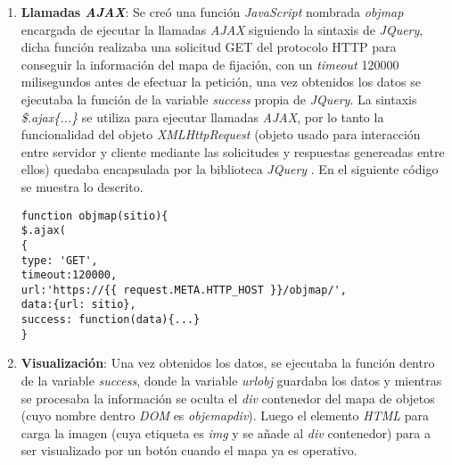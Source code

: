 \begin{enumerate}[label=\alph*) ,font=\bfseries] 
\item \textbf{Llamadas \textit{AJAX}}: Se creó una función \textit{JavaScript} nombrada 
\textit{objmap} encargada de ejecutar la llamadas \textit{AJAX} siguiendo la sintaxis de 
\textit{JQuery}, dicha función realizaba una solicitud GET del protocolo HTTP para conseguir
la información del mapa de fijación, con un \textit{timeout} 120000 milisegundos antes de efectuar
la petición, una vez obtenidos los datos se ejecutaba la función de la variable \textit{success} 
propia de \textit{JQuery}. La sintaxis \textit{\$.ajax\{...\}} se utiliza para ejecutar llamadas
\textit{AJAX}, por lo tanto la funcionalidad del objeto \textit{XMLHttpRequest} (objeto usado para 
interacción entre servidor y cliente mediante las solicitudes y respuestas genereadas entre ellos) \cite{ref14}
quedaba encapsulada por la biblioteca \textit{JQuery} \cite{ref15}. En el siguiente código se muestra lo descrito.
\newpage
\begin{lstlisting}[style=Java, caption={Llamada \textit{AJAX} para despliegue del Mapa de Objetos.}]
function objmap(sitio){
$.ajax(
{
type: 'GET',
timeout:120000,
url:'https://{{ request.META.HTTP_HOST }}/objmap/',
data:{url: sitio},
success: function(data){...}
}
\end{lstlisting}
\item \textbf{Visualización}: Una vez obtenidos los datos, se ejecutaba la función dentro de la variable \textit{success}, donde la variable \textit{urlobj} guardaba los datos y mientras se 
procesaba la información se oculta el \textit{div} contenedor del mapa de objetos (cuyo nombre
dentro \textit{DOM} es \textit{objemapdiv}). Luego el elemento \textit{HTML} para carga la imagen
(cuya etiqueta es \textit{img} y se añade al \textit{div} contenedor) para a ser visualizado por un 
botón cuando el mapa ya es operativo.
\begin{lstlisting}[style=Java, caption={Función de despligue del Mapa de Objetos.}]


\end{lstlisting}
\end{enumerate}
